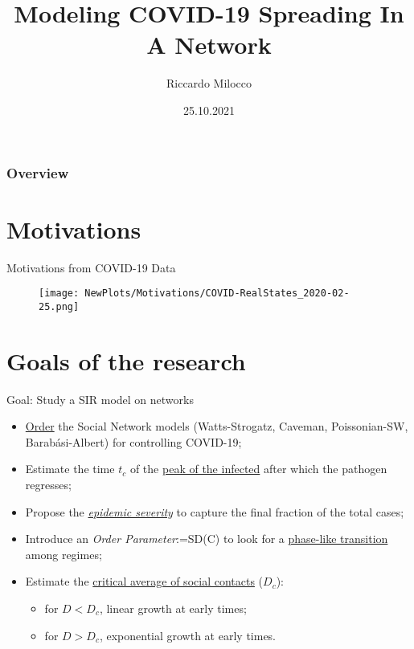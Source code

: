 \documentclass[xcolor={dvipsnames}]{beamer}
\title[Network Covid-19]{Modeling COVID-19 Spreading In A Network} %
\author{Riccardo Milocco} %
\institute[DFA - UniPD] %
{
{\normalsize Prof./Dr. Marco Baiesi} \\
\vspace{1cm}
{\normalsize Università Degli Studi di Padova} \\ %
\medskip
{\normalsize Dipartimento di Fisica e Astronomia G. Galilei} %
}
\date{25.10.2021} %
\begin{document}
\begin{frame}
\titlepage %
\end{frame}

\begin{frame}
\frametitle{Overview} %
\tableofcontents %
\end{frame}

\section{Motivations}
\begin{frame}{Motivations from COVID-19 Data}
	\begin{figure}[h]
		\centering
		\texttt{[image: NewPlots/Motivations/COVID-RealStates\_2020-02-25.png]}
	\end{figure}
\end{frame}

\section{Goals of the research}
\begin{frame}{Goal: Study a SIR model on networks}
\centering
\begin{itemize}
	\item \underline{Order} the Social Network models (Watts-Strogatz, Caveman, Poissonian-SW, Barabási-Albert) for controlling COVID-19; \vfill
	\item Estimate the time $t_c$ of the \underline{peak of the infected} after which the pathogen regresses; \vfill
	\item Propose the \underline{\textit{epidemic severity}} to capture the final fraction of the total cases; \vfill
	\item Introduce an \textit{Order Parameter}:=SD(C) to look for a \underline{phase-like transition} among regimes; \vfill
	\item Estimate the \underline{critical average of social contacts} ($D_c$):
	\begin{itemize}
		\item for $D<D_c$, linear growth at early times;
		\vspace{2mm }
		\item for $D>D_c$, exponential growth at early times.
	\end{itemize}
\end{itemize}
\end{frame}
\end{document}
